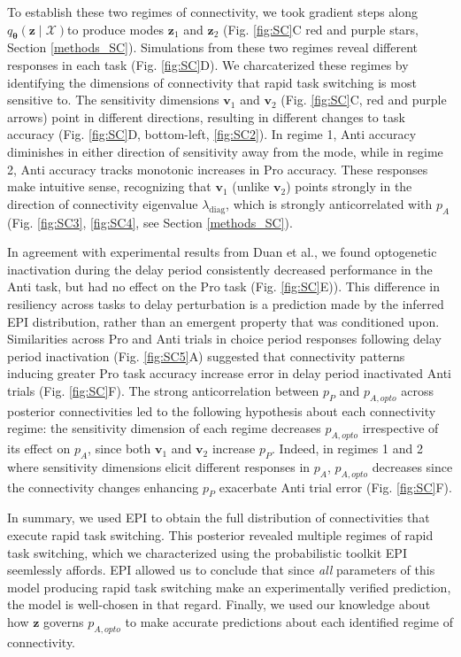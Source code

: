 \documentclass[11pt]{article}
\begin{document}
To establish these two regimes of connectivity, we took gradient steps along $q_{\bm{\theta}}(\mathbf{z} \mid \mathcal{X})$to produce modes $\mathbf{z}_1$ and $\mathbf{z}_2$  (Fig. \ref{fig:SC}C red and purple stars, Section \ref{methods_SC}).
Simulations from these two regimes reveal different responses in each task (Fig. \ref{fig:SC}D).
We charcaterized these regimes by identifying the dimensions of connectivity that rapid task switching is most sensitive to.
The sensitivity dimensions $\mathbf{v}_1$ and  $\mathbf{v}_2$ (Fig. \ref{fig:SC}C, red and purple arrows) point in different directions, resulting in different changes to task accuracy (Fig. \ref{fig:SC}D, bottom-left, \ref{fig:SC2}).
In regime 1, Anti accuracy diminishes in either direction of sensitivity away from the mode, while in regime 2, Anti accuracy tracks monotonic increases in Pro accuracy.
These responses make intuitive sense, recognizing that $\mathbf{v}_1$ (unlike $\mathbf{v}_2$) points strongly in the direction of connectivity eigenvalue $\lambda_{\text{diag}}$, which is strongly anticorrelated with $p_A$ (Fig. \ref{fig:SC3}, \ref{fig:SC4}, see Section \ref{methods_SC}).

In agreement with experimental results from Duan et al., we found optogenetic inactivation during the delay period consistently decreased performance in the Anti task, but had no effect on the Pro task (Fig. \ref{fig:SC}E)).
This difference in resiliency across tasks to delay perturbation is a prediction made by the inferred EPI distribution, rather than an emergent property that was conditioned upon.
Similarities across Pro and Anti trials in choice period responses following delay period inactivation (Fig. \ref{fig:SC5}A) suggested that connectivity patterns inducing greater Pro task accuracy increase error in delay period inactivated Anti trials (Fig. \ref{fig:SC}F).
The strong anticorrelation between $p_P$ and $p_{A, opto}$ across posterior connectivities led to the following hypothesis about each connectivity regime: the sensitivity dimension of each regime decreases $p_{A,opto}$ irrespective of its effect on $p_A$, since both $\mathbf{v}_1$ and $\mathbf{v}_2$ increase $p_P$.
Indeed, in regimes 1 and 2 where sensitivity dimensions elicit different responses in $p_A$, $p_{A,opto}$ decreases since the connectivity changes enhancing $p_P$ exacerbate Anti trial error (Fig. \ref{fig:SC}F).

In summary, we used EPI to obtain the full distribution of connectivities that execute rapid task switching.
This posterior revealed multiple regimes of rapid task switching, which we characterized using the probabilistic toolkit EPI seemlessly affords.
EPI allowed us to conclude that since \textit{all} parameters of this model producing rapid task switching make an experimentally verified prediction, the model is well-chosen in that regard.
Finally, we used our knowledge about how $\mathbf{z}$ governs $p_{A,opto}$ to make accurate predictions about each identified regime of connectivity.
\end{document}
